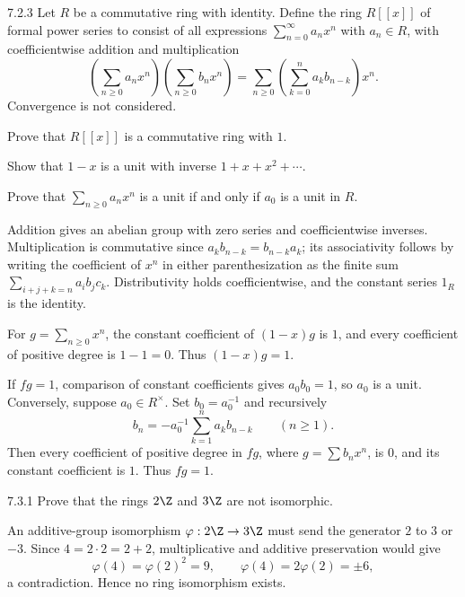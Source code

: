 \documentclass[11pt,oneside]{article}
\begin{document}
\begin{exercise}{7.2.3}
Let $R$ be a commutative ring with identity. Define the ring $R[[x]]$ of formal power series to consist of all expressions $\sum_{n=0}^\infty a_nx^n$ with $a_n\in R$, with coefficientwise addition and multiplication
\[
\left(\sum_{n\ge0}a_nx^n\right)\left(\sum_{n\ge0}b_nx^n\right)
=\sum_{n\ge0}\left(\sum_{k=0}^n a_kb_{n-k}\right)x^n.
\]
Convergence is not considered.
\begin{exercisesubparts}
\item Prove that $R[[x]]$ is a commutative ring with $1$.
\item Show that $1-x$ is a unit with inverse $1+x+x^2+\cdots$.
\item Prove that $\sum_{n\ge0}a_nx^n$ is a unit if and only if $a_0$ is a unit in $R$.
\end{exercisesubparts}
\end{exercise}
\begin{solution}
\begin{exercisesubparts}
\item Addition gives an abelian group with zero series and coefficientwise inverses. Multiplication is commutative since $a_kb_{n-k}=b_{n-k}a_k$; its associativity follows by writing the coefficient of $x^n$ in either parenthesization as the finite sum $\sum_{i+j+k=n}a_ib_jc_k$. Distributivity holds coefficientwise, and the constant series $1_R$ is the identity.
\item For $g=\sum_{n\ge0}x^n$, the constant coefficient of $(1-x)g$ is $1$, and every coefficient of positive degree is $1-1=0$. Thus $(1-x)g=1$.
\item If $fg=1$, comparison of constant coefficients gives $a_0b_0=1$, so $a_0$ is a unit. Conversely, suppose $a_0\in R^\times$. Set $b_0=a_0^{-1}$ and recursively
\[
b_n=-a_0^{-1}\sum_{k=1}^na_kb_{n-k}\qquad(n\ge1).
\]
Then every coefficient of positive degree in $fg$, where $g=\sum b_nx^n$, is $0$, and its constant coefficient is $1$. Thus $fg=1$.
\end{exercisesubparts}
\end{solution}

\begin{exercise}{7.3.1}
Prove that the rings $2\Z$ and $3\Z$ are not isomorphic.
\end{exercise}
\begin{solution}
An additive-group isomorphism $\varphi:2\Z\to3\Z$ must send the generator $2$ to $3$ or $-3$. Since $4=2\cdot2=2+2$, multiplicative and additive preservation would give
\[
\varphi(4)=\varphi(2)^2=9,
\qquad\varphi(4)=2\varphi(2)=\pm6,
\]
a contradiction. Hence no ring isomorphism exists.
\end{solution}
\end{document}
